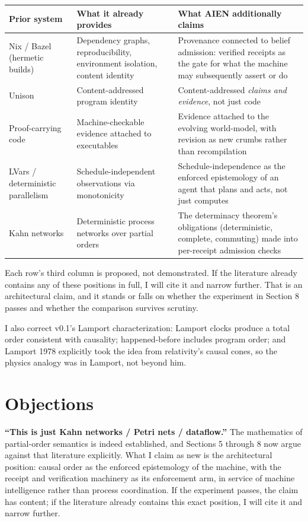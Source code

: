 \documentclass[11pt]{article}
\begin{document}
\begin{center}
\begin{tabular}{p{} p{} p{}}
\hline
\textbf{Prior system} & \textbf{What it already provides} & \textbf{What AIEN additionally claims} \\
\hline
Nix / Bazel (hermetic builds) & Dependency graphs, reproducibility, environment isolation, content identity & Provenance connected to belief admission: verified receipts as the gate for what the machine may subsequently assert or do \\
Unison & Content-addressed program identity & Content-addressed \textit{claims and evidence}, not just code \\
Proof-carrying code & Machine-checkable evidence attached to executables & Evidence attached to the evolving world-model, with revision as new crumbs rather than recompilation \\
LVars / deterministic parallelism & Schedule-independent observations via monotonicity & Schedule-independence as the enforced epistemology of an agent that plans and acts, not just computes \\
Kahn networks & Deterministic process networks over partial orders & The determinacy theorem's obligations (deterministic, complete, commuting) made into per-receipt admission checks \\
\hline
\end{tabular}
\end{center}

Each row's third column is proposed, not demonstrated. If the literature already contains any of these positions in full, I will cite it and narrow further. That is an architectural claim, and it stands or falls on whether the experiment in Section 8 passes and whether the comparison survives scrutiny.

I also correct v0.1's Lamport characterization: Lamport clocks produce a total order consistent with causality; happened-before includes program order; and Lamport 1978 explicitly took the idea from relativity's causal cones, so the physics analogy was in Lamport, not beyond him.

\section{Objections}

\textbf{``This is just Kahn networks / Petri nets / dataflow.''} The mathematics of partial-order semantics is indeed established, and Sections 5 through 8 now argue against that literature explicitly. What I claim as new is the architectural position: causal order as the enforced epistemology of the machine, with the receipt and verification machinery as its enforcement arm, in service of machine intelligence rather than process coordination. If the experiment passes, the claim has content; if the literature already contains this exact position, I will cite it and narrow further.
\end{document}
